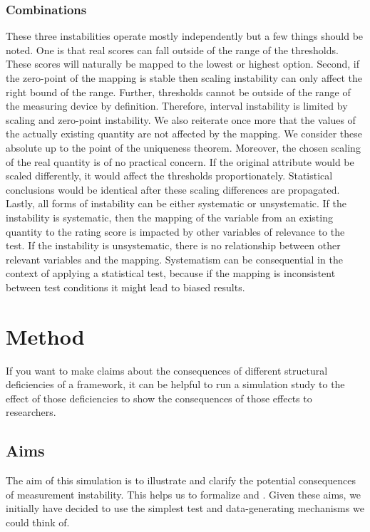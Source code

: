 \documentclass[utf8]{FrontiersinVancouver}
\begin{document}
\subsubsection{Combinations}
These three instabilities operate mostly independently but a few things should be noted. One is that real scores can fall outside of the range of the thresholds. These scores will naturally be mapped to the lowest or highest option. Second, if the zero-point of the mapping is stable then scaling instability can only affect the right bound of the range. Further, thresholds cannot be outside of the range of the measuring device by definition. Therefore, interval instability is limited by scaling and zero-point instability. We also reiterate once more that the values of the actually existing quantity are not affected by the mapping. We consider these absolute up to the point of the uniqueness theorem. Moreover, the chosen scaling of the real quantity is of no practical concern. If the original attribute would be scaled differently, it would affect the thresholds proportionately. Statistical conclusions would be identical after these scaling differences are propagated. Lastly, all forms of instability can be either systematic or unsystematic. If the instability is systematic, then the mapping of the variable from an existing quantity to the rating score is impacted by other variables of relevance to the test. If the instability is unsystematic, there is no relationship between other relevant variables and the mapping. Systematism can be consequential in the context of applying a statistical test, because if the mapping is inconsistent between test conditions it might lead to biased results. 

\section{Method}
If you want to make claims about the consequences of different structural deficiencies of a framework, it can be helpful to run a simulation study to  the effect of those deficiencies to show the consequences of those effects to researchers. 

\subsection{Aims}
The aim of this simulation is to illustrate and clarify the potential consequences of measurement instability. This helps us to formalize and . Given these aims, we initially have decided to use the simplest test and data-generating mechanisms we could think of. 
\end{document}
